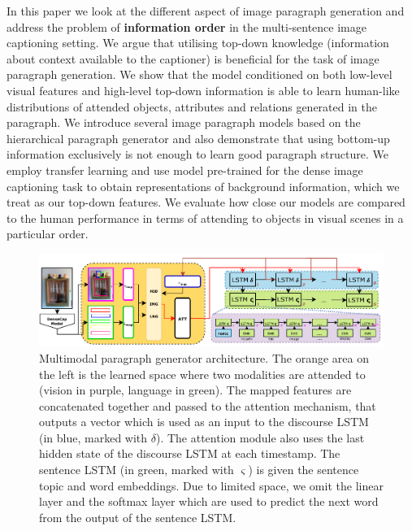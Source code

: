 \documentclass[11pt,a4paper]{article}
\begin{document}
In this paper we look at the different aspect of image paragraph generation and address the problem of \textbf{information order} in the multi-sentence image captioning setting.
We argue that utilising top-down knowledge (information about context available to the captioner) is beneficial for the task of image paragraph generation.
We show that the model conditioned on both low-level visual features and high-level top-down information is able to learn human-like distributions of attended objects, attributes and relations generated in the paragraph.
We introduce several image paragraph models based on the hierarchical paragraph generator  and also
demonstrate that using bottom-up information exclusively is not enough to learn good paragraph structure.
We employ transfer learning and use model pre-trained for the dense image captioning task \cite{densecap} to obtain representations of background information, which we treat as our top-down features.
We evaluate how close our models are compared to the human performance in terms of attending to objects in visual scenes in a particular order.

\fi



\begin{figure}[h]
 \includegraphics[width=\linewidth]{figures/model}
 \caption{Multimodal paragraph generator architecture.
 		The orange area on the left is the learned space where two modalities are attended to (vision in purple, language in green).
		The mapped features are concatenated together and passed to the attention mechanism, that outputs a vector which is used as an input to the discourse LSTM (in blue, marked with $\delta$).
		The attention module also uses the last hidden state of the discourse LSTM at each timestamp.
		The sentence LSTM (in green, marked with $\varsigma$) is given the sentence topic and word embeddings.
		Due to limited space, we omit the linear layer and the softmax layer which are used to predict the next word from the output of the sentence LSTM.}
 \label{fig:model}
\end{figure}
\end{document}
